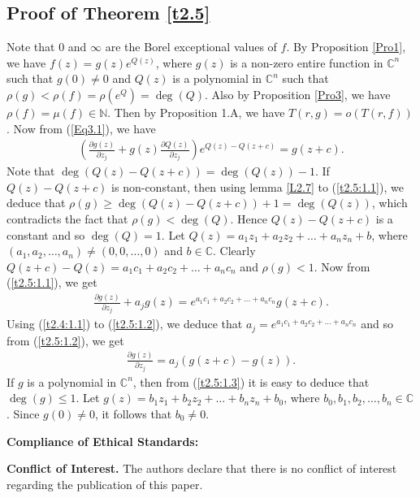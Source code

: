 \documentclass[11pt,reqno]{amsart}
\numberwithin{equation}{section}
\begin{document}
\subsection{{Proof of Theorem \ref{t2.5}}} Note that $0$ and $\infty$ are the Borel exceptional values of $f$.
By Proposition \ref{Pro1}, we have $f(z)=g(z)e^{Q(z)}$, where $g(z)$ is a non-zero entire function in $\mathbb{C}^n$ such that $g(0)\neq 0$ and $Q(z)$ is a polynomial in $\mathbb{C}^n$ such that $\rho(g)<\rho(f)=\rho(e^Q)=\deg(Q)$. Also by Proposition \ref{Pro3}, we have $\rho(f)=\mu(f)\in\mathbb{N}$. Then by Proposition 1.A, we have $T(r,g)=o(T(r,f))$. Now from (\ref{Eq3.1}), we have
\begin{align}\label{t2.5:1.1}
\left(\frac{\partial g(z)}{\partial z_j}+g(z)\frac{\partial Q(z)}{\partial z_j}\right)e^{Q(z)-Q(z+c)}=g(z+c).
\end{align}
Note that $\deg(Q(z)-Q(z+c))=\deg(Q(z))-1$. If $Q(z)-Q(z+c)$ is non-constant, then using lemma \ref{L2.7} to (\ref{t2.5:1.1}), we deduce that $\rho(g)\geq \deg(Q(z)-Q(z+c))+1=\deg(Q(z))$, which contradicts the fact that $\rho(g)<\deg(Q)$. Hence $Q(z)-Q(z+c)$ is a constant and so $\deg(Q)=1$. Let $Q(z)=a_1z_1+a_2z_2+\ldots+a_nz_n+b$, where $(a_1,a_2,\ldots,a_n)\neq (0,0,\ldots,0)$ and $b\in\mathbb{C}$. Clearly $Q(z+c)-Q(z)=a_1c_1+a_2c_2+\ldots+a_nc_n$ and $\rho(g)<1$. Now from (\ref{t2.5:1.1}), we get
\begin{align}\label{t2.5:1.2}
\frac{\partial g(z)}{\partial z_j}+a_jg(z)=e^{a_1c_1+a_2c_2+\ldots+a_nc_n}g(z+c).
\end{align}
Using (\ref{t2.4:1.1}) to (\ref{t2.5:1.2}), we deduce that $a_j=e^{a_1c_1+a_2c_2+\ldots+a_nc_n}$ and so from (\ref{t2.5:1.2}), we get
\begin{align}\label{t2.5:1.3}
\frac{\partial g(z)}{\partial z_j}=a_j(g(z+c)-g(z)).
\end{align}
If $g$ is a polynomial in $\mathbb{C}^n$, then from (\ref{t2.5:1.3}) it is easy to deduce that $\deg(g)\leq 1$. Let $g(z)=b_1z_1+b_2z_2+\ldots+b_nz_n+b_0$, where $b_0,b_1,b_2,\ldots,b_n\in\mathbb{C}$. Since $g(0)\neq 0$, it follows that $b_0\neq 0$.



\vspace{0.1in}
{\bf Compliance of Ethical Standards:}\par

{\bf Conflict of Interest.} The authors declare that there is no conflict of interest regarding the publication of this paper.\par
\end{document}
